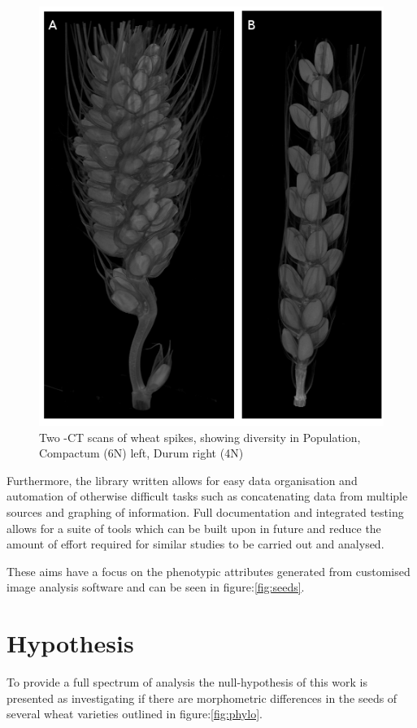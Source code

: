 \documentclass[11pt]{report}
\begin{document}
\begin{figure}[htb]
\centering
\includegraphics[width=12cm]{./images/spikes.png}
\caption{\label{fig:spikes}Two \textmu{}-CT scans of wheat spikes, showing diversity in Population, Compactum (6N) left, Durum right (4N)}
\end{figure}


Furthermore, the library written allows for easy data organisation and automation of otherwise difficult tasks such as concatenating data from multiple sources and graphing of information. Full documentation and integrated testing allows for a suite of tools which can be built upon in future and reduce the amount of effort required for similar studies to be carried out and analysed.

These aims have a focus on the phenotypic attributes generated from customised image analysis software \cite{Hughes2017} and can be seen in figure:\ref{fig:seeds}.

\section{Hypothesis}
\label{sec-1-5}
To provide a full spectrum of analysis the null-hypothesis of this work is presented as investigating if there are morphometric differences in the seeds of several wheat varieties outlined in figure:\ref{fig:phylo}.
\end{document}
